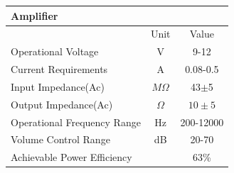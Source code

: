 \documentclass[a4paper,12pt,oneside,pdflatex,italian,final,twocolumn]{article}
\begin{document}
\begin{figure}[h]
\begin{minipage}{\textwidth}
\vspace{.8cm}
\begin{center}
    \begin{tabular}{|l|c|c|}
     \multicolumn{3}{l}{\textbf{Amplifier}}\\
    \toprule
       & Unit & Value \\
    \midrule
    Operational Voltage & V & 9-12\\
    Current Requirements & A &0.08-0.5\\
    Input Impedance(Ac) & $M\Omega$ & 43$\pm$5\\
    Output Impedance(Ac) & $\Omega$&$10\pm5$\\
    Operational Frequency Range & Hz &200-12000\\
    Volume Control Range & dB & 20-70\\
    Achievable Power Efficiency &  & 63\%\\
    
    \bottomrule
\end{tabular}
\end{center}
\end{minipage}
\end{figure}


\raggedright
\vspace{-.5cm}
\end{document}

